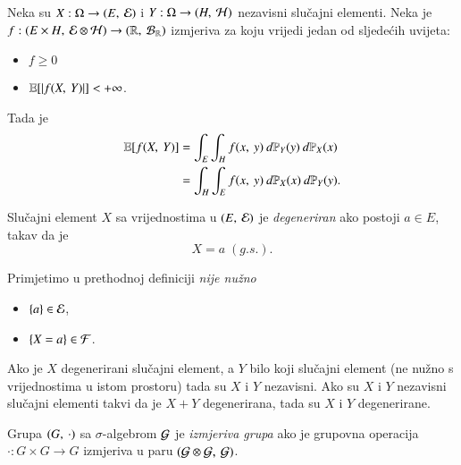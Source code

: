\begin{zad} \label{zad:7.10}
    Neka su $X : \Omega \to ({E}, \: {\mathcal{E}})$ i $Y : \Omega \to ({H}, \: {\mathcal{H}})$ nezavisni slu\v cajni elementi.
    Neka je $f : ({E \times H}, \: {\mathcal{E} \otimes \mathcal{H}}) \to ({\mathbb{R}}, \: {\mathcal{B}_{\mathbb{R}}})$ izmjeriva za koju vrijedi jedan od sljede\' cih uvijeta:
    \begin{itemize}
        \item $f \geq 0$
        \item $\mathbb{E} [|f ({X}, \: {Y})|] < +\infty$.
    \end{itemize}
    Tada je
    \begin{align*}
        \mathbb{E} [ f ({X}, \: {Y}) ]
        &= \int_{E} \int_{H} f ({x}, \: {y}) \: d \mathbb{P}_Y (y) \: d \mathbb{P}_X (x) \\
        &= \int_H \int_E f ({x}, \: {y}) \: d \mathbb{P}_X (x) \: d \mathbb{P}_Y (y).
    \end{align*}
\end{zad}

\begin{defn}    \label{defn:7.10-1}
    Slu\v cajni element $X$ sa vrijednostima u $({E}, \: {\mathcal{E}})$ je \emph{degeneriran} ako postoji $a \in E$, takav da je
    \begin{equation*}
        X = a \; (g.s.).
    \end{equation*}
\end{defn}

Primjetimo u prethodnoj definiciji \emph{nije nu\v zno}
\begin{itemize}
    \item[] $\{a\} \in \mathcal{E}$,
    \item[] $\{X = a\} \in \mathcal{F}$.
\end{itemize}

\begin{zad} \label{zad:7.11}
    Ako je $X$ degenerirani slu\v cajni element, a $Y$ bilo koji slu\v cajni element (ne nu\v zno s vrijednostima u istom prostoru) tada su $X$ i $Y$ nezavisni.
    Ako su $X$ i $Y$ nezavisni slu\v cajni elementi takvi da je $X + Y$ degenerirana, tada su $X$ i $Y$ degenerirane.
\end{zad}

\begin{defn}    \label{defn:7.11-1}
    Grupa $({G}, \: {\cdot})$ sa $\sigma$-algebrom $\mathcal{G}$ je \emph{izmjeriva grupa} ako je grupovna operacija $\cdot : G \times G \to G$ izmjeriva u paru $({\mathcal{G} \otimes \mathcal{G}}, \: {\mathcal{G}})$.
\end{defn}

